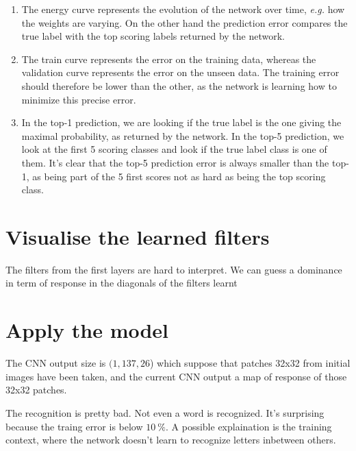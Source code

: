 \documentclass{article}
\begin{document}
\begin{enumerate}
	\item The energy curve represents the evolution of the network over time, \textit{e.g.} how the weights are varying. On the other hand the prediction error compares the true label with the top scoring labels returned by the network.
	\item The train curve represents the error on the training data, whereas the validation curve represents the error on the unseen data. The training error should therefore be lower than the other, as the network is learning how to minimize this precise error.
	\item In the top-1 prediction, we are looking if the true label is the one giving the maximal probability, as returned by the network. In the top-5 prediction, we look at the first 5 scoring classes and look if the true label class is one of them. It's clear that the top-5 prediction error is always smaller than the top-1, as being part of the 5 first scores not as hard as being the top scoring class.
\end{enumerate}

\section{Visualise the learned filters}


The filters from the first layers are hard to interpret. We can guess a dominance in term of response in the diagonals of the filters learnt

\section{Apply the model}


The CNN output size is \((1, 137, 26\)) which suppose that patches 32x32 from initial images have been taken, and the current CNN output a map of response of those 32x32 patches.


The recognition is pretty bad. Not even a word is recognized. It's surprising because the traing error is below \(10~\%\). A possible explaination is the training context, where the network doesn't learn to recognize letters inbetween others.
\end{document}
